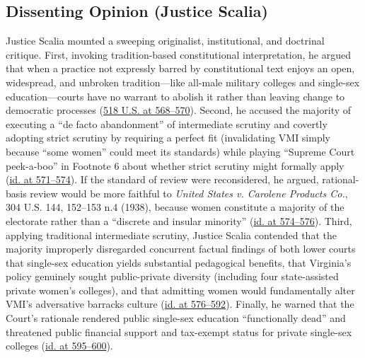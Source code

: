 \documentclass[12pt]{article}
\begin{document}
\subsection{Dissenting Opinion (Justice Scalia)}
Justice Scalia mounted a sweeping originalist, institutional, and doctrinal critique. First, invoking tradition-based constitutional interpretation, he argued that when a practice not expressly barred by constitutional text enjoys an open, widespread, and unbroken tradition---like all-male military colleges and single-sex education---courts have no warrant to abolish it rather than leaving change to democratic processes (\href{https://www.law.cornell.edu/supct/html/94-1941.ZD.html}{518 U.S. at 568--570}). Second, he accused the majority of executing a ``de facto abandonment'' of intermediate scrutiny and covertly adopting strict scrutiny by requiring a perfect fit (invalidating VMI simply because ``some women'' could meet its standards) while playing ``Supreme Court peek-a-boo'' in Footnote 6 about whether strict scrutiny might formally apply (\href{https://www.law.cornell.edu/supct/html/94-1941.ZD.html}{id. at 571--574}). If the standard of review were reconsidered, he argued, rational-basis review would be more faithful to \textit{United States v. Carolene Products Co.}, 304 U.S. 144, 152--153 n.4 (1938), because women constitute a majority of the electorate rather than a ``discrete and insular minority'' (\href{https://www.law.cornell.edu/supct/html/94-1941.ZD.html}{id. at 574--576}). Third, applying traditional intermediate scrutiny, Justice Scalia contended that the majority improperly disregarded concurrent factual findings of both lower courts that single-sex education yields substantial pedagogical benefits, that Virginia's policy genuinely sought public-private diversity (including four state-assisted private women's colleges), and that admitting women would fundamentally alter VMI's adversative barracks culture (\href{https://www.law.cornell.edu/supct/html/94-1941.ZD.html}{id. at 576--592}). Finally, he warned that the Court's rationale rendered public single-sex education ``functionally dead'' and threatened public financial support and tax-exempt status for private single-sex colleges (\href{https://www.law.cornell.edu/supct/html/94-1941.ZD.html}{id. at 595--600}).
\end{document}
